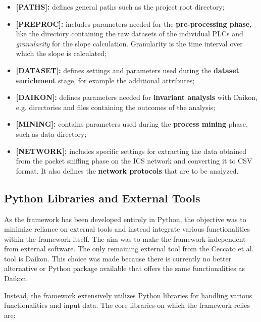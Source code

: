 \begin{itemize}
	\item \textbf{[PATHS]:} defines general paths such as the project root directory;
	
	\item \textbf{[PREPROC]:} includes parameters needed for the \textbf{pre-processing phase}, like the directory containing the raw datasets of the individual PLCs and \textit{granularity} for the slope calculation. Granularity is the time interval over which the slope is calculated;
	
	\item \textbf{[DATASET]:} defines settings and parameters used during the \textbf{dataset enrichment} stage, for example the additional attributes;
	
	\item \textbf{[DAIKON]:} defines parameters needed for \textbf{invariant analysis} with Daikon, e.g. directories and files containing the outcomes of the analysis;
	
	\item \textbf{[MINING]:} contains parameters used during the \textbf{process mining} phase, such as data directory;
	
	\item \textbf{[NETWORK]:} includes specific settings for extracting the data obtained from the packet sniffing phase on the ICS network and converting it to CSV format. It also defines the \textbf{network protocols} that are to be analyzed.
\end{itemize}

\subsection{Python Libraries and External Tools}
\label{subsec:4_tools_libraries}
As the framework has been developed entirely in Python, the objective was to minimize reliance on external tools and instead integrate various functionalities within the framework itself. The aim was to make the framework independent from external software. The only remaining external tool from the Ceccato et al. tool is Daikon. This choice was made because there is currently no better alternative or Python package available that offers the same functionalities as Daikon.

\bigskip
Instead, the framework extensively utilizes Python libraries for handling various functionalities and input data. The core libraries on which the framework relies are:

